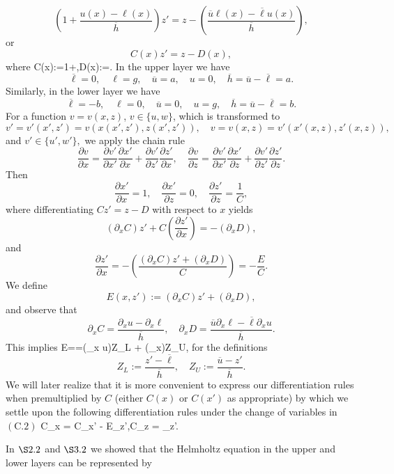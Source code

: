 $$\left(1+\frac{u(x)-\ell(x)}{\overline{h}}\right)z'= z-\left(\frac{\overline{u}\ell(x)-\overline{\ell}u(x)}{\overline{h}}\right), $$
or
$$C(x)z'=z-D(x),$$
where
\be
C(x):=1+,\quad D(x):=.
\ee
In the upper layer we have
$$\overline{\ell}=0,\quad \ell=g, \quad \overline{u}=a, \quad u = 0,\quad \overline{h}=\overline{u}-\overline{\ell}=a.$$
Similarly, in the lower layer we have
$$\overline{\ell}=-b,\quad \ell=0, \quad \overline{u}=0, \quad u = g,\quad \overline{h}=\overline{u}-\overline{\ell}=b.$$
For a function $v=v(x,z)$, $v\in\{u,w\}$, which is transformed to
$$v'=v'(x',z')=v(x(x',z'),z(x',z')), \quad v=v(x,z)=v'(x'(x,z),z'(x,z)),$$
and $v'\in \{u',w'\},$ we apply the chain rule
$$\frac{\partial v}{\partial x}=\frac{\partial v'}{\partial x'}\frac{\partial x'}{\partial x}+\frac{\partial v'}{\partial z'}\frac{\partial z'}{\partial x},\quad  \frac{\partial v}{\partial z}=\frac{\partial v'}{\partial x'}\frac{\partial x'}{\partial z}+\frac{\partial v'}{\partial z'}\frac{\partial z'}{\partial z}.$$
Then
$$\frac{\partial x'}{\partial x}=1,\quad \frac{\partial x'}{\partial z}=0,\quad \frac{\partial z'}{\partial z}=\frac 1C,$$
where differentiating $Cz'=z-D$ with respect to $x$ yields
$$\left(\partial_x C\right)z'+C\left(\frac{\partial z'}{\partial x}\right)=-\left(\partial_x D\right),$$
and
$$\frac{\partial z'}{\partial x}=-\left(\frac{\left(\partial_x C\right)z'+\left(\partial_x D\right)}{C}\right)=-\frac EC.$$
We define
$$E(x,z'):=\left(\partial_x C\right)z'+\left(\partial_x D\right),$$
and observe that
$$\partial_x C=\frac{\partial_x u - \partial_x \ell}{\overline{h}},\quad \partial_x D=\frac{\overline{u}\partial_x \ell - \overline{\ell}\partial_x u}{\overline{h}}.   $$
This implies
\be
E==(\partial_x u)Z_L + (\partial_x\ell)Z_U,
\ee
for the definitions
$$Z_L:=\frac{z'-\overline{\ell}}{\overline{h}},\quad Z_U:=\frac{\overline{u}-z'}{\overline{h}}.$$
We will later realize that it is more convenient to express our differentiation rules when premultiplied by $C$ (either $C(x)$ or $C(x')$ as appropriate) by which we settle upon the following differentiation rules under the change of variables in $(\text{C}.2)$
\be
C\partial_x = C\partial_{x'} - E\partial_{z'},\quad C\partial_z = \partial_{z'}.
\ee
\vspace{-10mm}
\begin{flushleft}In $\S 2.2$ and $\S 3.2$ we showed that the Helmholtz equation in the upper and lower layers can be represented by
\end{flushleft}
